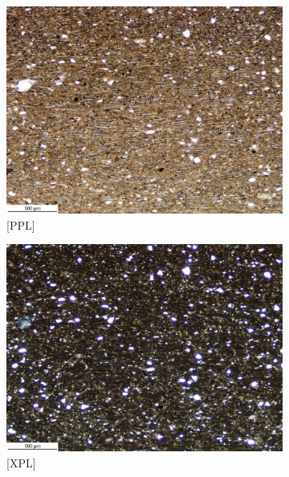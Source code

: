 \documentclass[a4paper]{article}
\begin{document}
\begin{figure}[H]
	\centering
	\begin{subfigure}[t]{.49\textwidth}
		\includegraphics[width=\textwidth]{ThinSections/55-4_4x_PPL.jpg}
		\caption{[PPL]}
	\end{subfigure}\hspace{.5em}\hfill
	\begin{subfigure}[t]{.49\textwidth}
		\includegraphics[width=\textwidth]{ThinSections/55-4_4x_XPL.jpg}
		\caption{[XPL]}
	\end{subfigure}
	\begin{subfigure}[t]{.49\textwidth}

\end{subfigure}
\end{figure}
\end{document}

